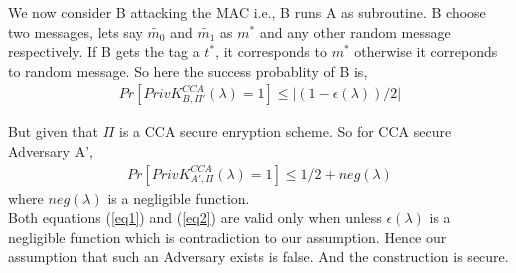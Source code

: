 












We now consider B attacking the MAC i.e., B runs A as subroutine. B choose two messages, lets 
say $\widetilde{m_0}$ and $\widetilde{m_1}$ as $m^*$ and any other random message
respectively. If B gets the tag a $t^*$, it corresponds to $m^*$ otherwise it correponds 
to random message. So here the success probablity of B is,
\begin{align}
    Pr[ PrivK_{B,\Pi'}^{CCA}(\lambda) = 1] \leq |(1 - \epsilon(\lambda))/2|
    \label{eq1}
\end{align}

But given that $\Pi$ is a CCA secure enryption scheme. So for CCA secure Adversary A',
\begin{align}
    Pr[ PrivK_{A',\Pi}^{CCA}(\lambda) = 1]  \leq 1/2 + neg(\lambda)
    \label{eq2}
\end{align}
where $neg(\lambda)$ is a negligible function. \\

Both equations (\ref*{eq1}) and (\ref*{eq2}) are valid only when
unless $\epsilon(\lambda)$ is a negligible function which is contradiction to 
our assumption. Hence our assumption that such an Adversary exists is false. 
And the construction is secure.
